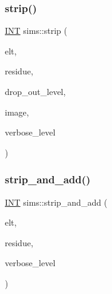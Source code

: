 \subsubsection{\texorpdfstring{strip()}{strip()}}
{\footnotesize\ttfamily \mbox{\hyperlink{galois_8h_a09fddde158a3a20bd2dcadb609de11dc}{I\+NT}} sims\+::strip (\begin{DoxyParamCaption}\item[{\mbox{\hyperlink{galois_8h_a09fddde158a3a20bd2dcadb609de11dc}{I\+NT}} $\ast$}]{elt,  }\item[{\mbox{\hyperlink{galois_8h_a09fddde158a3a20bd2dcadb609de11dc}{I\+NT}} $\ast$}]{residue,  }\item[{\mbox{\hyperlink{galois_8h_a09fddde158a3a20bd2dcadb609de11dc}{I\+NT}} \&}]{drop\+\_\+out\+\_\+level,  }\item[{\mbox{\hyperlink{galois_8h_a09fddde158a3a20bd2dcadb609de11dc}{I\+NT}} \&}]{image,  }\item[{\mbox{\hyperlink{galois_8h_a09fddde158a3a20bd2dcadb609de11dc}{I\+NT}}}]{verbose\+\_\+level }\end{DoxyParamCaption})}

\mbox{\label{classsims_a9b8596883351af7ca772a7b0866a4027}} 
\subsubsection{\texorpdfstring{strip\+\_\+and\+\_\+add()}{strip\_and\_add()}}
{\footnotesize\ttfamily \mbox{\hyperlink{galois_8h_a09fddde158a3a20bd2dcadb609de11dc}{I\+NT}} sims\+::strip\+\_\+and\+\_\+add (\begin{DoxyParamCaption}\item[{\mbox{\hyperlink{galois_8h_a09fddde158a3a20bd2dcadb609de11dc}{I\+NT}} $\ast$}]{elt,  }\item[{\mbox{\hyperlink{galois_8h_a09fddde158a3a20bd2dcadb609de11dc}{I\+NT}} $\ast$}]{residue,  }\item[{\mbox{\hyperlink{galois_8h_a09fddde158a3a20bd2dcadb609de11dc}{I\+NT}}}]{verbose\+\_\+level }\end{DoxyParamCaption})}

\mbox{\label{classsims_a8abb8f266671da3862c8bc60294c23e8}} 
